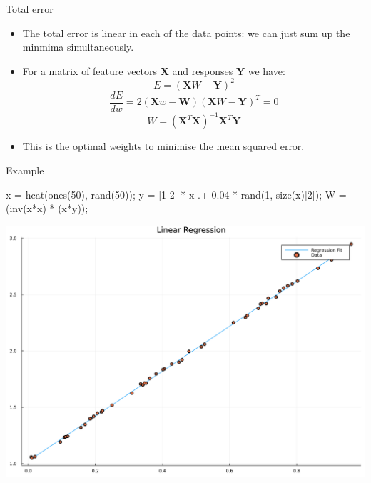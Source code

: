 \documentclass[
  ignorenonframetext,
]{beamer}
\newenvironment{Shaded}{\begin{snugshade}}{\end{snugshade}}
\newcommand{\CharTok}[1]{\textcolor[rgb]{0.13,0.47,0.30}{#1}}
\newcommand{\FloatTok}[1]{\textcolor[rgb]{0.68,0.00,0.00}{#1}}
\newcommand{\FunctionTok}[1]{\textcolor[rgb]{0.28,0.35,0.67}{#1}}
\newcommand{\NormalTok}[1]{\textcolor[rgb]{0.00,0.23,0.31}{#1}}
\newcommand{\OperatorTok}[1]{\textcolor[rgb]{0.37,0.37,0.37}{#1}}
\begin{document}
\begin{frame}{Total error}
\protect\hypertarget{total-error}{}
\begin{itemize}
\item
  The total error is linear in each of the data points: we can just sum
  up the minmima simultaneously.
\item
  For a matrix of feature vectors \(\textbf{X}\) and responses
  \(\textbf{Y}\) we have: \[E =  (\textbf{X} W - \textbf{Y})^2\]
  \[\frac{dE}{dw} = 2(\textbf{X}w - \textbf{W})(\textbf{X}W - \textbf{Y})^T = 0\]
  \[ W = (\textbf{X}^T \textbf{X})^{-1} \textbf{X}^T \textbf{Y} \]
\item
  This is the optimal weights to minimise the mean squared error.
\end{itemize}
\end{frame}

\begin{frame}[fragile]{Example}
\protect\hypertarget{example}{}
\begin{Shaded}
\begin{Highlighting}[]
\NormalTok{x }\OperatorTok{=} \FunctionTok{hcat}\NormalTok{(}\FunctionTok{ones}\NormalTok{(}\FloatTok{50}\NormalTok{), }\FunctionTok{rand}\NormalTok{(}\FloatTok{50}\NormalTok{))}\CharTok{\textquotesingle{};}
\NormalTok{y }\OperatorTok{=}\NormalTok{ [}\FloatTok{1} \FloatTok{2}\NormalTok{] }\OperatorTok{*}\NormalTok{ x }\OperatorTok{.+} \FloatTok{0.04} \OperatorTok{*} \FunctionTok{rand}\NormalTok{(}\FloatTok{1}\NormalTok{, }\FunctionTok{size}\NormalTok{(x)[}\FloatTok{2}\NormalTok{]);}
\NormalTok{W }\OperatorTok{=}\NormalTok{ (}\FunctionTok{inv}\NormalTok{(x}\OperatorTok{*}\NormalTok{x}\OperatorTok{\textquotesingle{}}\NormalTok{) }\OperatorTok{*}\NormalTok{ (x}\OperatorTok{*}\NormalTok{y}\OperatorTok{\textquotesingle{}}\NormalTok{))}\CharTok{\textquotesingle{};}
\end{Highlighting}
\end{Shaded}

\includegraphics{lecture1_files/figure-beamer/cell-7-output-1.pdf}
\end{frame}
\end{document}
